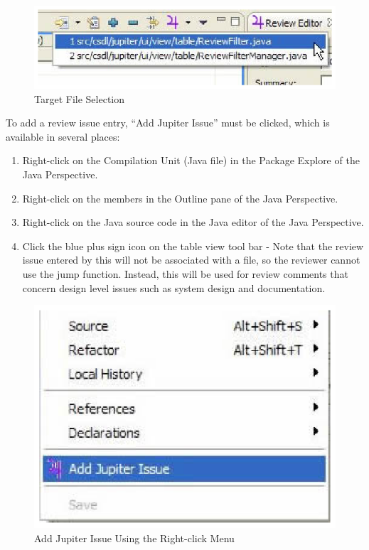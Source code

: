 \begin{figure}[htbp]
  \centering
  \includegraphics{images/fig3-24.eps}
  \caption{Target File Selection}
  \label{fig3-24}
\end{figure}

To add a review issue entry, ``Add Jupiter Issue'' must be clicked, which is available in several places: 

\begin{enumerate}
	\item Right-click on the Compilation Unit (Java file) in the Package Explore of the Java Perspective.
	\item Right-click on the members in the Outline pane of the Java Perspective.
	\item Right-click on the Java source code in the Java editor of the Java Perspective.
	\item Click the blue plus sign icon on the table view tool bar - Note that the review issue entered by this will not be associated with a file, so the reviewer cannot use the jump function. Instead, this will be used for review comments that concern design level issues such as system design and documentation.
\end{enumerate}

\begin{figure}[htbp]
  \centering
  \includegraphics{images/fig3-25.eps}
  \caption{Add Jupiter Issue Using the Right-click Menu}
  \label{fig3-25}
\end{figure}

